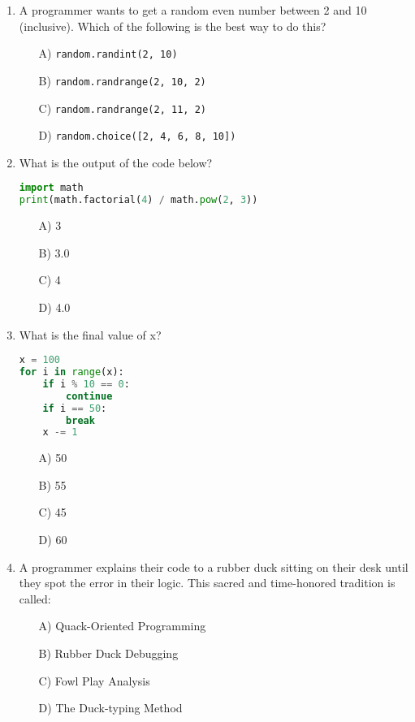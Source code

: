 \documentclass[9pt]{article}
\begin{document}
\begin{multicols}{2}
\begin{enumerate}
\item A programmer wants to get a random even number between 2 and 10 (inclusive). Which of the following is the best way to do this?
\begin{enumerate}
    \item[A)] \texttt{random.randint(2, 10)}
    \item[B)] \texttt{random.randrange(2, 10, 2)}
    \item[C)] \texttt{random.randrange(2, 11, 2)}
    \item[D)] \texttt{random.choice([2, 4, 6, 8, 10])}
\end{enumerate}

\item What is the output of the code below?
\begin{lstlisting}[language=Python]
import math
print(math.factorial(4) / math.pow(2, 3))
\end{lstlisting}
\begin{enumerate}
\item[A)] 3
\item[B)] 3.0
\item[C)] 4
\item[D)] 4.0
\end{enumerate}

\item What is the final value of x?
\begin{lstlisting}[language=Python]
x = 100
for i in range(x):
    if i % 10 == 0:
        continue
    if i == 50:
        break
    x -= 1
\end{lstlisting}
\begin{enumerate}
\item[A)] 50
\item[B)] 55
\item[C)] 45
\item[D)] 60
\end{enumerate}

\item A programmer explains their code to a rubber duck sitting on their desk until they spot the error in their logic. This sacred and time-honored tradition is called:
\begin{enumerate}
    \item[A)] Quack-Oriented Programming
    \item[B)] Rubber Duck Debugging
    \item[C)] Fowl Play Analysis
    \item[D)] The Duck-typing Method
\end{enumerate}


\end{enumerate}
\end{multicols}
\end{document}
